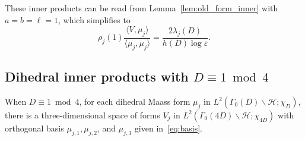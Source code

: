 \documentclass[11pt,reqno,oneside]{amsart}
\theoremstyle{plain}
\theoremstyle{definition}
\newcommand{\chid}{\chi_{4D}}
\begin{document}
These inner products can be read from Lemma~\ref{lem:old_form_inner} with $a =
  b = \ell = 1$, which simplifies to
\begin{equation}\label{eq:v_mu_easy}
  \rho_j(1) \frac{\langle V, \mu_j \rangle}
  {\langle \mu_j, \mu_j \rangle}
  =
  \frac{2 \lambda_j(D)}{h(D) \log \varepsilon}.
\end{equation}



\subsection{Dihedral inner products with \texorpdfstring{$D \equiv 1 \bmod 4$}{D = 1 mod 4}}

When $D \equiv 1 \bmod 4$, for each dihedral Maass form $\mu_j$ in
$L^2(\Gamma_0(D) \backslash \mathcal{H}; \chi_D)$, there is a three-dimensional
space of forms $V_j$ in $L^2(\Gamma_0(4D) \backslash \mathcal{H}; \chid)$ with
orthogonal basis $\mu_{j, 1}, \mu_{j, 2}$, and $\mu_{j, 3}$ given
in~\eqref{eq:basis}.
\end{document}
